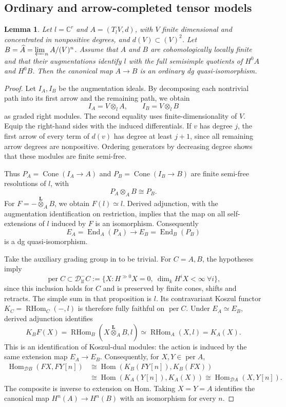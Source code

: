 \documentclass[12pt,a4paper,english,reqno]{amsart}
\theoremstyle{plain}
\newtheorem{lem}[thm]{Lemma}
\theoremstyle{definition}
\numberwithin{equation}{section}
\def\Hom{\operatorname{Hom}}
\def\End{\operatorname{End}}
\def\perf{\operatorname{per}}
\def\calD{{\mathcal D}}
\def\bbC{{\mathbb C}}
\def\iso{\cong}
\def\ox{\otimes}
\def\Lox{\overset{\mathbf{L}}{\otimes}}
\def\RHom{\operatorname{RHom}}
\def\Cone{\operatorname{Cone}}
\begin{document}
\subsection{Ordinary and arrow-completed tensor models}
\begin{lem}\label{lem:completion}
Let $l=\bbC^r$ and $A=(T_lV,d)$, with $V$ finite dimensional and concentrated in nonpositive degrees, and $d(V)\subset(V)^2$. Let
$B=\widehat A=\varprojlim_nA/(V)^n$.
Assume that $A$ and $B$ are cohomologically locally finite and that their augmentations identify $l$ with the full semisimple quotients of $H^0A$ and $H^0B$. Then the canonical map $A\to B$ is an ordinary dg quasi-isomorphism.
\end{lem}
\begin{proof}
Let $I_A,I_B$ be the augmentation ideals. By decomposing each nontrivial path into its first arrow and the remaining path, we obtain
\[
 I_A=V\ox_lA,\qquad I_B=V\ox_lB
\]
as graded right modules. The second equality uses finite-dimensionality of $V$. Equip the right-hand sides with the induced differentials. If $v$ has degree $j$, the first arrow of every term of $d(v)$ has degree at least $j+1$, since all remaining arrow degrees are nonpositive. Ordering generators by decreasing degree shows that these modules are finite semi-free.

Thus $P_A=\Cone(I_A\to A)$ and $P_B=\Cone(I_B\to B)$ are finite semi-free resolutions of $l$, with
\[
 P_A\ox_AB\iso P_B.
\]
For $F=-\Lox_AB$, we obtain $F(l)\simeq l$. Derived adjunction, with the augmentation identification on restriction, implies that the map on all self-extensions of $l$ induced by $F$ is an isomorphism. Consequently
\[
 E_A=\End_A(P_A)\longrightarrow E_B=\End_B(P_B)
\]
is a dg quasi-isomorphism.

Take the auxiliary grading group in \cite[Proposition 4.5(1)]{Fushimi} to be trivial. For $C=A,B$, the hypotheses imply
\[
 \perf C\subset\calD^-_{\mathrm{lf}}C
 :=\{X:H^{\gg0}X=0,\ \dim_kH^iX<\infty\ \forall i\},
\]
since this inclusion holds for $C$ and is preserved by finite cones, shifts and retracts. The simple sum in that proposition is $l$. Its contravariant Koszul functor
$K_C=\RHom_C(-,l)$ is therefore fully faithful on $\perf C$.
Under $E_A\simeq E_B$, derived adjunction identifies
\[
 K_BF(X)=\RHom_B(X\Lox_AB,l)\simeq\RHom_A(X,l)=K_A(X).
\]
This is an identification of Koszul-dual modules: the action is induced by the same extension map $E_A\to E_B$. Consequently, for $X,Y\in\perf A$,
\[
 \begin{aligned}
 \Hom_{\calD B}(FX,FY[n])
 &\iso\Hom(K_B(FY[n]),K_B(FX))\\
 &\iso\Hom(K_A(Y[n]),K_A(X))
 \iso\Hom_{\calD A}(X,Y[n]).
 \end{aligned}
\]
The composite is inverse to extension on Hom. Taking $X=Y=A$ identifies the canonical map
$H^n(A)\to H^n(B)$ with an isomorphism for every $n$.
\end{proof}
\end{document}
